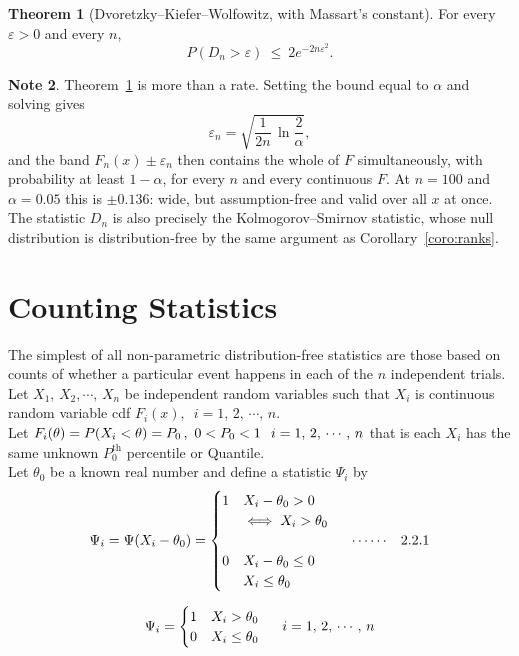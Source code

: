 \documentclass[12pt,a4paper]{report}
\theoremstyle{definition}
\newtheorem{thm}{Theorem}[section]
\newtheorem{note}[thm]{Note}
\theoremstyle{plain}
\begin{document}
\begin{thm}[Dvoretzky--Kiefer--Wolfowitz, with Massart's constant]
\label{thm:dkw}
For every $\varepsilon>0$ and every $n$,
$$P\left(D_n > \varepsilon\right)\ \leq\ 2e^{-2n\varepsilon^{2}} .$$
\end{thm}

\begin{note}
Theorem~\ref{thm:dkw} is more than a rate. Setting the bound equal to $\alpha$
and solving gives
$$\varepsilon_n = \sqrt{\frac{1}{2n}\,\ln\frac{2}{\alpha}} ,$$
and the band $F_n(x)\pm\varepsilon_n$ then contains the whole of $F$
simultaneously, with probability at least $1-\alpha$, for every $n$ and every
continuous $F$. At $n=100$ and $\alpha=0.05$ this is $\pm 0.136$: wide, but
assumption-free and valid over all $x$ at once. The statistic $D_n$ is also
precisely the Kolmogorov--Smirnov statistic, whose null distribution is
distribution-free by the same argument as Corollary~\ref{coro:ranks}.
\end{note}

\section{Counting Statistics}
 The simplest of all non-parametric distribution-free statistics are those based on counts of whether a particular event happens in each of the $n$ independent trials. Let $X_1, \, X_2, \cdots, \, X_n$ be independent random variables such that $X_i$    is continuous random variable cdf $F_i(x), \,\, \, i = 1, \, 2, \, \cdots, \, n$.\\
Let $F_i(\theta) = P(X_i < \theta) = P_0\, , \, \, 0 < P_0 < 1\,  \hspace{0.2cm} i = 1, \, 2, \, \cdots, \, n$ that is each $X_i$ has the same unknown $P_0^{\text{th}}$ percentile or Quantile.\\
Let $\theta_0$ be a known real number and define a statistic $\Psi_i$ by 
$$\Psi_i = \Psi(X_i - \theta_0) =
\begin{cases}
1 & X_i - \theta_0 > 0\\
& \iff X_i > \theta_0\\\\
0 & X_i - \theta_0 \leq 0\\
  & X_i \leq \theta_0\\
\end{cases}\hspace{0.5cm}\cdots\cdots\hspace{0.3cm} 2.2.1
$$

$$\Psi_i = 
\begin{cases}
1 & X_i > \theta_0\\
0 & X_i \leq \theta_0\\
\end{cases}
\hspace{0.5cm} i = 1,\, 2, \, \cdots, \, n$$ 
 
\end{document}
